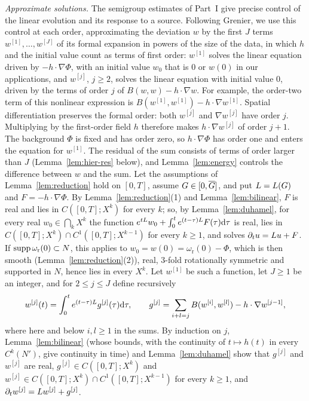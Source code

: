 \emph{Approximate solutions.} The semigroup estimates of Part~I give precise
control of the linear evolution and its response to a source. Following
Grenier, we use this control at each order, approximating the deviation $w$
by the first $J$ terms $w^{[1]},\dots,w^{[J]}$ of its formal expansion in powers of
the size of the data, in which $h$ and the initial value count as terms of first
order: $w^{[1]}$ solves the linear equation driven by $-h\cdot\nabla\Phi$, with an
initial value $w_0$ that is $0$ or $w(0)$ in our applications, and $w^{[j]}$,
$j\ge2$, solves the linear equation with initial value $0$, driven by the terms of
order $j$ of $B(w,w)-h\cdot\nabla w$. For example, the order-two term of this
nonlinear expression is $B(w^{[1]},w^{[1]})-h\cdot\nabla w^{[1]}$.
Spatial differentiation preserves the formal order: both $w^{[j]}$ and
$\nabla w^{[j]}$ have order $j$. Multiplying by the first-order field $h$
therefore makes $h\cdot\nabla w^{[j]}$ of order $j+1$. The background $\Phi$
is fixed and has order zero, so $h\cdot\nabla\Phi$ has order one and enters
the equation for $w^{[1]}$. The residual of the sum consists of terms of
order larger than $J$ (Lemma~\ref{lem:hier-res} below), and
Lemma~\ref{lem:energy} controls the difference
between $w$ and the sum. Let the assumptions of Lemma~\ref{lem:reduction} hold
on $[0,T]$, assume $G\in[0,\overline{G}]$, and put $L=L(G)$ and $F=-h\cdot\nabla\Phi$.
By Lemma~\ref{lem:reduction}\textup{(1)} and Lemma~\ref{lem:bilinear}, $F$ is real
and lies in $C([0,T];X^k)$ for every $k$; so, by Lemma~\ref{lem:duhamel}, for every
real $w_0\in\bigcap_kX^k$ the function
$e^{tL}w_0+\int_0^te^{(t-\tau)L}F(\tau)\dd\tau$ is real, lies in
$C([0,T];X^k)\cap C^1([0,T];X^{k-1})$ for every $k\ge1$, and solves
$\partial_tu=L u+F$. If $\operatorname{supp}\omega_{\mathrm r}(0)\subset N$, this applies to
$w_0=w(0)=\omega_{\mathrm r}(0)-\Phi$, which is then smooth
(Lemma~\ref{lem:reduction}\textup{(2)}), real, $3$-fold rotationally symmetric and supported in $N$,
hence lies in every $X^k$. Let $w^{[1]}$ be such a function, let $J\ge1$ be an integer,
and for $2\le j\le J$ define recursively
\begin{equation}
\label{eq:hier}
w^{[j]}(t)=\int_0^te^{(t-\tau)L}g^{[j]}(\tau)\dd\tau,\qquad
g^{[j]}=\sum_{i+l=j}B(w^{[i]},w^{[l]})-h\cdot\nabla w^{[j-1]},
\end{equation}
where here and below $i,l\ge1$ in the sums. By induction on $j$,
Lemma~\ref{lem:bilinear} (whose bounds, with the continuity of $t\mapsto h(t)$ in
every $C^k(N')$, give continuity in time) and Lemma~\ref{lem:duhamel} show that
$g^{[j]}$ and $w^{[j]}$ are real, $g^{[j]}\in C([0,T];X^k)$ and
$w^{[j]}\in C([0,T];X^k)\cap C^1([0,T];X^{k-1})$ for every $k\ge1$, and
$\partial_tw^{[j]}=L w^{[j]}+g^{[j]}$.

